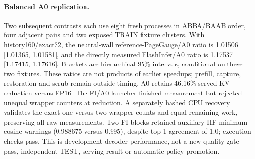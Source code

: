 \paragraph{Balanced A0 replication.} Two subsequent contrasts each use eight fresh processes in ABBA/BAAB order, four adjacent pairs and two exposed TRAIN fixture clusters. With history160/exact32, the neutral-wall reference-PageGauge/A0 ratio is 1.01506 [1.01365, 1.01581], and the directly measured FlashInfer/A0 ratio is 1.17537 [1.17415, 1.17616]. Brackets are hierarchical 95\% intervals, conditional on these two fixtures. These ratios are not products of earlier speedups; prefill, capture, restoration and scrub remain outside timing. A0 retains 46.16\% served-KV reduction versus FP16. The FI/A0 launcher finished measurement but rejected unequal wrapper counters at reduction. A separately hashed CPU recovery validates the exact one-versus-two-wrapper counts and equal remaining work, preserving all raw measurements. Two FI blocks retained auxiliary HF minimum-cosine warnings (0.988675 versus 0.995), despite top-1 agreement of 1.0; execution checks pass. This is development decoder performance, not a new quality gate pass, independent TEST, serving result or automatic policy promotion.
